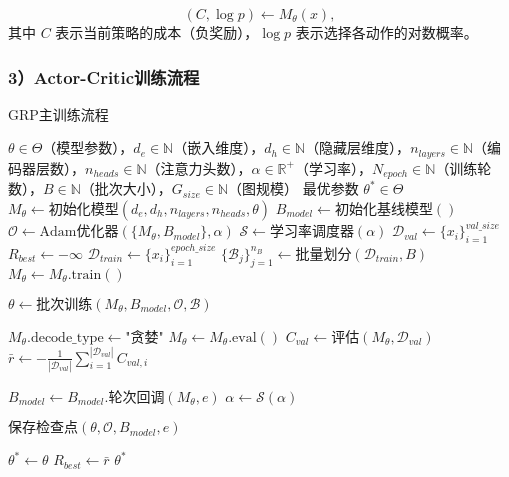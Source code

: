 \documentclass[AutoFakeBold]{LZUThesis}
\begin{document}
\begin{equation}
	(C, \log p) \leftarrow M_{\theta}(x),
\end{equation}
其中 $C$ 表示当前策略的成本（负奖励），$\log p$ 表示选择各动作的对数概率。

\subsubsection{3）Actor-Critic训练流程}
\begin{algorithm}[H]
	\begin{algorithmic}[1]
		\caption{GRP主训练流程}
		\label{alg:grp_main_training}
		\Require $\theta \in \Theta$（模型参数），$d_e \in \mathbb{N}$（嵌入维度），$d_h \in \mathbb{N}$（隐藏层维度），$n_{layers} \in \mathbb{N}$（编码器层数），$n_{heads} \in \mathbb{N}$（注意力头数），$\alpha \in \mathbb{R}^{+}$（学习率），$N_{epoch} \in \mathbb{N}$（训练轮数），$B \in \mathbb{N}$（批次大小），$G_{size} \in \mathbb{N}$（图规模）
		\Ensure 最优参数 $\theta^* \in \Theta$
		\State $M_{\theta} \leftarrow \text{初始化模型}(d_e, d_h, n_{layers}, n_{heads}, \theta)$
		\State $B_{model} \leftarrow \text{初始化基线模型}()$
		\State $\mathcal{O} \leftarrow \text{Adam优化器}(\{M_{\theta}, B_{model}\}, \alpha)$
		\State $\mathcal{S} \leftarrow \text{学习率调度器}(\alpha)$
		\State $\mathcal{D}_{val} \leftarrow \{x_i\}_{i=1}^{val\_size}$ 
		\State $R_{best} \leftarrow -\infty$ 
		\State $\mathcal{D}_{train} \leftarrow \{x_i\}_{i=1}^{epoch\_size}$ 
		\State $\{\mathcal{B}_j\}_{j=1}^{n_B} \leftarrow \text{批量划分}(\mathcal{D}_{train}, B)$
		\State $M_{\theta} \leftarrow M_{\theta}.\text{train}()$ 

		\State $\theta \leftarrow \text{批次训练}(M_{\theta}, B_{model}, \mathcal{O}, \mathcal{B})$ 
		\EndFor

		\State $M_{\theta}.\text{decode\_type} \leftarrow \text{"贪婪"}$
		\State $M_{\theta} \leftarrow M_{\theta}.\text{eval}()$
		\State $C_{val} \leftarrow \text{评估}(M_{\theta}, \mathcal{D}_{val})$
		\State $\bar{r} \leftarrow -\frac{1}{|\mathcal{D}_{val}|}\sum_{i=1}^{|\mathcal{D}_{val}|} C_{val,i}$ 

		\State $B_{model} \leftarrow B_{model}.\text{轮次回调}(M_{\theta}, e)$
		\State $\alpha \leftarrow \mathcal{S}(\alpha)$ 

		\State $\text{保存检查点}(\theta, \mathcal{O}, B_{model}, e)$
		\EndIf

		\State $\theta^* \leftarrow \theta$ 
		\State $R_{best} \leftarrow \bar{r}$
		\EndIf
		\EndFor
		\State \Return $\theta^*$
	\end{algorithmic}
\end{algorithm}
\end{document}
